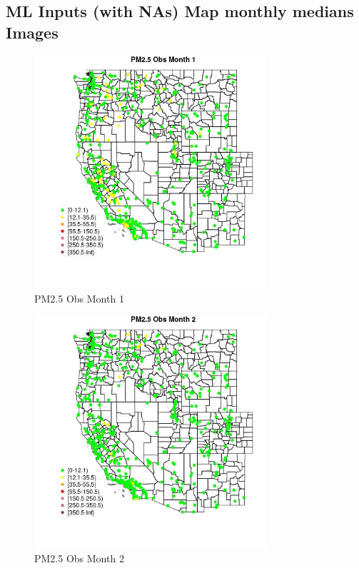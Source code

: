 
\subsection{ML Inputs (with NAs) Map monthly medians Images} 
 

\begin{figure} 
\centering  
\includegraphics[width=0.77\textwidth]{Code_Outputs/Report_ML_input_PM25_Step4_part_e_de_duplicated_aves_compiled_2019-05-14wNAs_MapObsMo1PM25_Obs.jpg} 
\caption{\label{fig:Report_ML_input_PM25_Step4_part_e_de_duplicated_aves_compiled_2019-05-14wNAsMapObsMo1PM25_Obs}PM2.5 Obs Month 1} 
\end{figure} 
 

\begin{figure} 
\centering  
\includegraphics[width=0.77\textwidth]{Code_Outputs/Report_ML_input_PM25_Step4_part_e_de_duplicated_aves_compiled_2019-05-14wNAs_MapObsMo2PM25_Obs.jpg} 
\caption{\label{fig:Report_ML_input_PM25_Step4_part_e_de_duplicated_aves_compiled_2019-05-14wNAsMapObsMo2PM25_Obs}PM2.5 Obs Month 2} 
\end{figure} 
 

